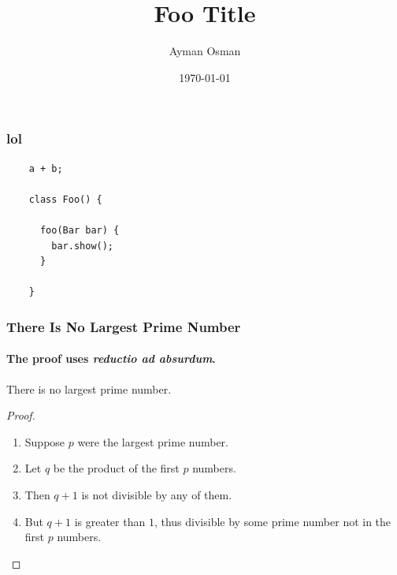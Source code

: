 \documentclass{beamer}
\begin{document}
\title{Foo Title}   
\author{Ayman Osman} 
\date{\today} 

\frame{\titlepage} 

\begin{frame}[fragile]
  \frametitle{lol}

  \begin{lstlisting}
    a + b;

    class Foo() {

      foo(Bar bar) {
        bar.show();
      }

    }
  \end{lstlisting}
  
\end{frame}




\begin{frame}
  \frametitle{There Is No Largest Prime Number}
  \framesubtitle{The proof uses \textit{reductio ad absurdum}.}
  \begin{theorem}
    There is no largest prime number.
  \end{theorem}
  \begin{proof}
    \begin{enumerate}
    \item<1-| alert@1> Suppose $p$ were the largest prime number.
    \item<2-> Let $q$ be the product of the first $p$ numbers.
    \item<3-> Then $q+1$ is not divisible by any of them.
    \item<1-> But $q + 1$ is greater than $1$, thus divisible by some prime
      number not in the first $p$ numbers.\qedhere
    \end{enumerate}
  \end{proof}
\end{frame}
\end{document}
